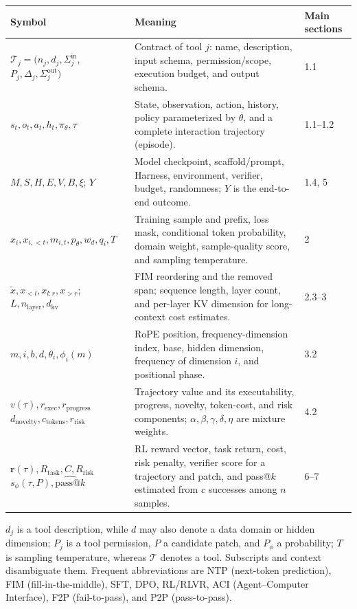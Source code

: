 \documentclass[10pt,a4paper,UTF8,fontset=none]{ctexart}
\renewcommand{\arraystretch}{1.18}
\begin{document}
\begingroup
\small
\setlength{\tabcolsep}{4pt}
\renewcommand{\arraystretch}{1.12}
\noindent
\begin{tabularx}{\textwidth}{p{4.5cm}Yp{1.55cm}}
\toprule
\textbf{Symbol} & \textbf{Meaning} & \textbf{Main sections} \\
\midrule
{}
& Contract of tool $j$: name, description, input schema, permission/scope, execution budget, and output schema. & 1.1 \\
$s_t,o_t,a_t,h_t,\pi_\theta,\tau$
& State, observation, action, history, policy parameterized by $\theta$, and a complete interaction trajectory (episode). & 1.1--1.2 \\
$M,S,H,E,V,B,\xi$; $Y$
& Model checkpoint, scaffold/prompt, Harness, environment, verifier, budget, randomness; $Y$ is the end-to-end outcome. & 1.4, 5 \\
$x_i,x_{i,<t},m_{i,t},p_\theta,w_d,q_i,T$
& Training sample and prefix, loss mask, conditional token probability, domain weight, sample-quality score, and sampling temperature. & 2 \\
$\tilde{x},x_{<l},x_{l:r},x_{>r}$; $L,n_{\mathrm{layer}},d_{\mathrm{kv}}$
& FIM reordering and the removed span; sequence length, layer count, and per-layer KV dimension for long-context cost estimates. & 2.3--3 \\
$m,i,b,d,\theta_i,\phi_i(m)$
& RoPE position, frequency-dimension index, base, hidden dimension, frequency of dimension $i$, and positional phase. & 3.2 \\
& Trajectory value and its executability, progress, novelty, token-cost, and risk components; $\alpha,\beta,\gamma,\delta,\eta$ are mixture weights. & 4.2 \\
& RL reward vector, task return, cost, risk penalty, verifier score for a trajectory and patch, and pass@$k$ estimated from $c$ successes among $n$ samples. & 6--7 \\
\bottomrule
\end{tabularx}
\endgroup

\begin{keybox}
\hspace{0.3em}$d_j$ is a tool description, while $d$ may also denote a data domain or hidden dimension; $P_j$ is a tool permission, $P$ a candidate patch, and $P_\phi$ a probability; $T$ is sampling temperature, whereas $\mathcal{T}$ denotes a tool. Subscripts and context disambiguate them. Frequent abbreviations are NTP (next-token prediction), FIM (fill-in-the-middle), SFT, DPO, RL/RLVR, ACI (Agent--Computer Interface), F2P (fail-to-pass), and P2P (pass-to-pass).
\end{keybox}
\end{document}
